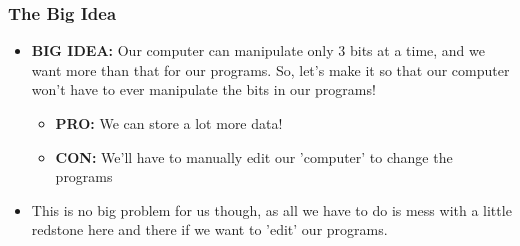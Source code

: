 \documentclass{beamer}
\begin{document}
    		\begin{frame}
    			\frametitle{The Big Idea}
    			\begin{itemize}
    				\item \textbf{BIG IDEA:} Our computer can manipulate only 3 bits at a time, and we want more than that for our programs. So, let's make it so that our computer won't have to ever manipulate the bits in our programs!
    				\begin{itemize}
    					\item \textbf{PRO:} We can store a lot more data!
    					\item \textbf{CON:} We'll have to manually edit our 'computer' to change the programs
    				\end{itemize}
    				\item This is no big problem for us though, as all we have to do is mess with a little redstone here and there if we want to 'edit' our programs.
    			\end{itemize}
    		\end{frame}
    		
\end{document}

